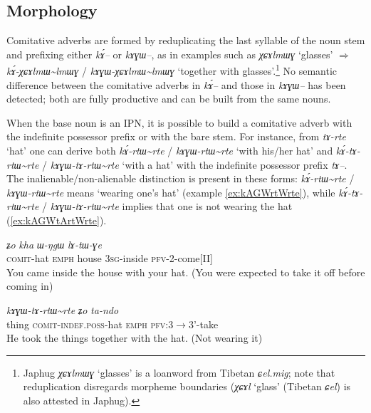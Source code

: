 \documentclass[oldfontcommands,oneside,a4paper,11pt]{article}
\newcommand{\ipa}[1]{{\phon\textit{#1}}} %
\newcommand{\tld}{\textasciitilde{}}
\begin{document}
\subsection{Morphology}
Comitative adverbs are formed by reduplicating the last syllable of the noun stem and prefixing either \ipa{kɤ́--} or \ipa{kɤɣɯ--}, as in examples such as \ipa{χɕɤlmɯɣ} `glasses' $\Rightarrow$ \ipa{kɤ́-χɕɤlmɯ\tld{}lmɯɣ} / \ipa{kɤɣɯ-χɕɤlmɯ\tld{}lmɯɣ} `together with glasses'.\footnote{Japhug \ipa{χɕɤlmɯɣ} `glasses' is a loanword from Tibetan \ipa{ɕel.mig}; note that reduplication disregards morpheme boundaries (\ipa{χɕɤl} `glass' (Tibetan \ipa{ɕel}) is also attested in Japhug). } No semantic difference between the comitative adverbs in \ipa{kɤ́--} and those in \ipa{kɤɣɯ--} has been detected; both are fully productive and can be built from the same nouns.

When the base noun is an IPN, it is possible to build a comitative adverb with the indefinite possessor prefix or with the bare stem. For instance, from \ipa{tɤ-rte} `hat' one can derive both \ipa{kɤ́-rtɯ\tld{}rte} / \ipa{kɤɣɯ-rtɯ\tld{}rte} `with his/her hat' and \ipa{kɤ́-tɤ-rtɯ\tld{}rte} /  \ipa{kɤɣɯ-tɤ-rtɯ\tld{}rte} `with a hat' with the indefinite possessor prefix \ipa{tɤ--}. The inalienable/non-alienable distinction is present in these forms: \ipa{kɤ́-rtɯ\tld{}rte} / \ipa{kɤɣɯ-rtɯ\tld{}rte} means `wearing one's hat' (example \ref{ex:kAGWrtWrte}), while \ipa{kɤ́-tɤ-rtɯ\tld{}rte} /  \ipa{kɤɣɯ-tɤ-rtɯ\tld{}rte} implies that one is not wearing the hat (\ref{ex:kAGWtArtWrte}).



\begin{exe}
\ex \label{ex:kAGWrtWrte}
\gll \ipa{kɤɣɯ-rtɯ\tld{}rte} 	\ipa{ʑo} 	\ipa{kha} 	\ipa{ɯ-ŋgɯ} 	\ipa{lɤ-tɯ-ɣe} 	\\
\textsc{comit}-hat \textsc{emph} house \textsc{3sg}-inside \textsc{pfv}-2-come[II] \\
\glt You came inside the house with your hat. (You were expected to take it off before coming in)
\end{exe}

\begin{exe}
\ex \label{ex:kAGWtArtWrte}
\gll  \ipa{laχtɕha} 	\ipa{kɤɣɯ-tɤ-rtɯ\tld{}rte} 	\ipa{ʑo} 	\ipa{ta-ndo}  \\
thing \textsc{comit-indef.poss}-hat \textsc{emph} \textsc{pfv}:3$\rightarrow$3'-take \\
\glt He took the things together with the hat. (Not wearing it)
\end{exe}
\end{document}
